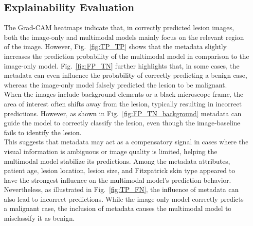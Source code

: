 \documentclass{article}
\begin{document}
	
	\subsection{Explainability Evaluation}
	The Grad-CAM heatmaps indicate that, in correctly predicted lesion images, both the image-only and multimodal models mainly focus on the relevant region of the image. However, Fig.~\ref{fig:TP_TP} shows that the metadata slightly increases the prediction probability of the multimodal model in comparison to the image-only model. Fig.~\ref{fig:FP_TN} further highlights that, in some cases, the metadata can even influence the probability of correctly predicting a benign case, whereas the image-only model falsely predicted the lesion to be malignant.\\	
	When the images include background elements or a black microscope frame, the area of interest often shifts away from the lesion, typically resulting in incorrect predictions. However, as shown in Fig.~\ref{fig:FP_TN_background} metadata can guide the model to correctly classify the lesion, even though the image-baseline fails to identify the lesion.\\	
	This suggests that metadata may act as a compensatory signal in cases where the visual information is ambiguous or image quality is limited, helping the multimodal model stabilize its predictions. Among the metadata attributes, patient age, lesion location, lesion size, and Fitzpatrick skin type appeared to have the strongest influence on the multimodal model’s prediction behavior.\\
	Nevertheless, as illustrated in Fig.~\ref{fig:TP_FN}, the influence of metadata can also lead to incorrect predictions. While the image-only model correctly predicts a malignant case, the inclusion of metadata causes the multimodal model to misclassify it as benign.
	

	
	
\end{document}
